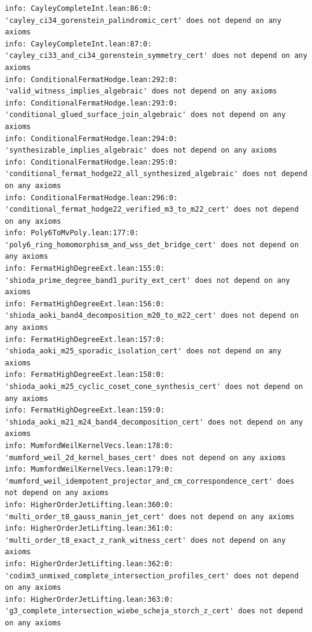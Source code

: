 \documentclass[11pt,a4paper]{article}
\begin{document}
\begin{lstlisting}[language={},basicstyle=\ttfamily\scriptsize,caption={Verbatim \texttt{lake clean \&\& lake build} axiom-audit receipts for all $19$ public extension theorems in \texttt{LeanMillenniumExt}.}]
info: CayleyCompleteInt.lean:86:0: 'cayley_ci34_gorenstein_palindromic_cert' does not depend on any axioms
info: CayleyCompleteInt.lean:87:0: 'cayley_ci33_and_ci34_gorenstein_symmetry_cert' does not depend on any axioms
info: ConditionalFermatHodge.lean:292:0: 'valid_witness_implies_algebraic' does not depend on any axioms
info: ConditionalFermatHodge.lean:293:0: 'conditional_glued_surface_join_algebraic' does not depend on any axioms
info: ConditionalFermatHodge.lean:294:0: 'synthesizable_implies_algebraic' does not depend on any axioms
info: ConditionalFermatHodge.lean:295:0: 'conditional_fermat_hodge22_all_synthesized_algebraic' does not depend on any axioms
info: ConditionalFermatHodge.lean:296:0: 'conditional_fermat_hodge22_verified_m3_to_m22_cert' does not depend on any axioms
info: Poly6ToMvPoly.lean:177:0: 'poly6_ring_homomorphism_and_wss_det_bridge_cert' does not depend on any axioms
info: FermatHighDegreeExt.lean:155:0: 'shioda_prime_degree_band1_purity_ext_cert' does not depend on any axioms
info: FermatHighDegreeExt.lean:156:0: 'shioda_aoki_band4_decomposition_m20_to_m22_cert' does not depend on any axioms
info: FermatHighDegreeExt.lean:157:0: 'shioda_aoki_m25_sporadic_isolation_cert' does not depend on any axioms
info: FermatHighDegreeExt.lean:158:0: 'shioda_aoki_m25_cyclic_coset_cone_synthesis_cert' does not depend on any axioms
info: FermatHighDegreeExt.lean:159:0: 'shioda_aoki_m21_m24_band4_decomposition_cert' does not depend on any axioms
info: MumfordWeilKernelVecs.lean:178:0: 'mumford_weil_2d_kernel_bases_cert' does not depend on any axioms
info: MumfordWeilKernelVecs.lean:179:0: 'mumford_weil_idempotent_projector_and_cm_correspondence_cert' does not depend on any axioms
info: HigherOrderJetLifting.lean:360:0: 'multi_order_t8_gauss_manin_jet_cert' does not depend on any axioms
info: HigherOrderJetLifting.lean:361:0: 'multi_order_t8_exact_z_rank_witness_cert' does not depend on any axioms
info: HigherOrderJetLifting.lean:362:0: 'codim3_unmixed_complete_intersection_profiles_cert' does not depend on any axioms
info: HigherOrderJetLifting.lean:363:0: 'g3_complete_intersection_wiebe_scheja_storch_z_cert' does not depend on any axioms
\end{lstlisting}
\end{document}
